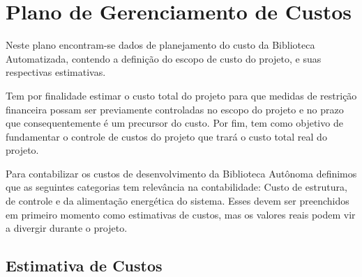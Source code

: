 \chapter[Plano de Gerenciamento de Custos] {Plano de Gerenciamento de Custos}
Neste plano encontram-se dados de planejamento do custo da Biblioteca Automatizada, contendo a definição do escopo de custo do projeto, e suas respectivas estimativas.

Tem por finalidade estimar o custo total do projeto para que medidas de restrição financeira possam ser previamente controladas no escopo do projeto e no prazo que consequentemente é um precursor do custo. Por fim, tem como objetivo de fundamentar o controle de custos do projeto que trará o custo total real do projeto.

Para contabilizar os custos de desenvolvimento da Biblioteca Autônoma definimos que as seguintes categorias tem relevância na contabilidade: Custo de estrutura, de controle e da alimentação energética do sistema. Esses devem ser preenchidos em primeiro momento como estimativas de custos, mas os valores reais podem vir a divergir durante o projeto.

\section{Estimativa de Custos}

